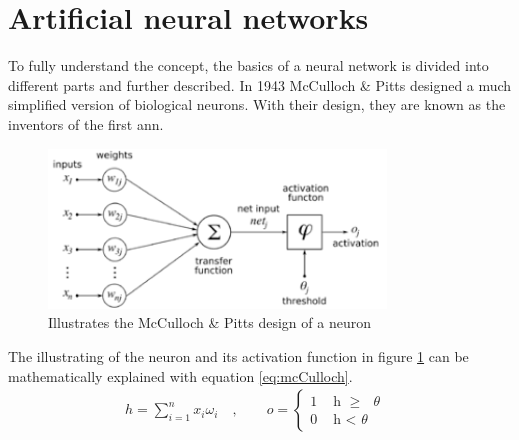 \documentclass[USenglish]{ifimaster}  %
\begin{document}
\section{Artificial neural networks}
To fully understand the concept, the basics of a neural network is divided into different parts and further described.
\newline
\newline
In 1943 McCulloch \& Pitts designed a much simplified version of biological neurons\cite{mcculloch_pitts}. With their design, they are known as the inventors of the first \ac{ann}.
\begin{figure}[ht]
    \centering
    \includegraphics[width=0.8\textwidth]{bilder/mcculloch_and_pitts.png}
    \caption{Illustrates the McCulloch \& Pitts design of a neuron \cite{website:mcCulloch_img}}
    \label{fig:mcculoch_and_pitts}
\end{figure}
The illustrating of the neuron and its activation function in figure \ref{fig:mcculoch_and_pitts} can be mathematically explained with equation \ref{eq:mcCulloch}.
\begin{equation}\label{eq:mcCulloch}
\begin{aligned}
    {h = \sum_{i=1}^{n} x_i \omega_i \quad , \quad\quad o = 
\begin{cases}
    1 & \text{ h $\geq$ $\theta$ }  \\
    0 & \text{ h < $\theta$ }
\end{cases}}
\end{aligned}
\end{equation}

\end{document}
